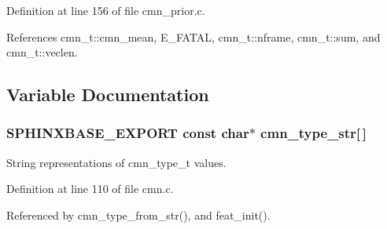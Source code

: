 Definition at line 156 of file cmn\-\_\-prior.\-c.



References cmn\-\_\-t\-::cmn\-\_\-mean, E\-\_\-\-F\-A\-T\-A\-L, cmn\-\_\-t\-::nframe, cmn\-\_\-t\-::sum, and cmn\-\_\-t\-::veclen.



\subsection{Variable Documentation}
\subsubsection[{cmn\-\_\-type\-\_\-str}]{\setlength{\rightskip}{0pt plus 5cm}S\-P\-H\-I\-N\-X\-B\-A\-S\-E\-\_\-\-E\-X\-P\-O\-R\-T const char$\ast$ cmn\-\_\-type\-\_\-str[$\,$]}\label{cmn_8h_ae2ab0bad7168386076c43fc2a421867f}


String representations of cmn\-\_\-type\-\_\-t values. 



Definition at line 110 of file cmn.\-c.



Referenced by cmn\-\_\-type\-\_\-from\-\_\-str(), and feat\-\_\-init().

